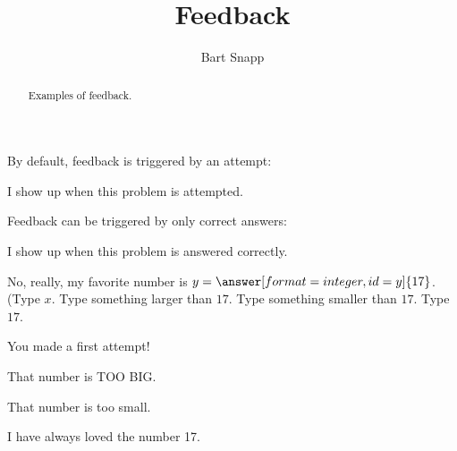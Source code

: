 \documentclass{ximera}
\title[Examples:]{Feedback}
\author{Bart Snapp}
\begin{document}
\begin{abstract}
  Examples of feedback.
\end{abstract}
\maketitle

By default, feedback is triggered by an attempt:
\begin{exercise}
  \begin{multipleChoice}
  \end{multipleChoice}
  \begin{feedback}
    I show up when this problem is attempted. 
  \end{feedback}
\end{exercise}


Feedback can be triggered by only correct answers:
\begin{exercise}
  \begin{multipleChoice}
  \end{multipleChoice}
  \begin{feedback}[correct]
    I show up when this problem is answered correctly.
  \end{feedback}
\end{exercise}

\begin{problem}
  No, really, my favorite number is $y = \answer[format=integer,id=y]{17}$.
 (Type $x$. Type something larger than $17$. Type something smaller than $17$. Type $17$.
  \begin{feedback}[attempt]
    You made a first attempt!
  \end{feedback}

  \begin{feedback}[y>17]
    That number is TOO BIG.
  \end{feedback}

  \begin{feedback}[y<17]
    That number is too small.
  \end{feedback}

  \begin{feedback}[correct]
    I have always loved the number 17.
  \end{feedback}
\end{problem}
\end{document}
